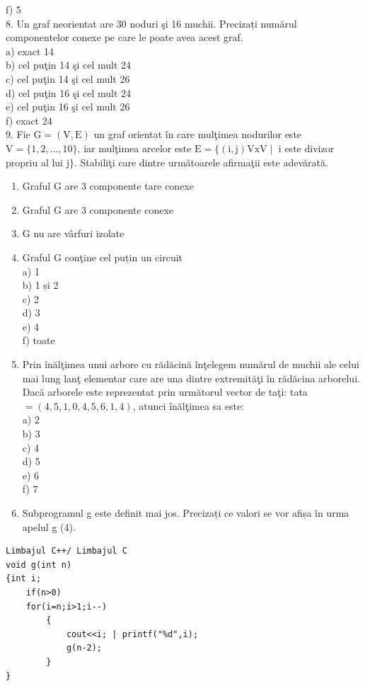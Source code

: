 \documentclass[10pt]{article}
\begin{document}
f) 5\\
8. Un graf neorientat are 30 noduri şi 16 muchii. Precizați numărul componentelor conexe pe care le poate avea acest graf.\\
a) exact 14\\
b) cel puţin 14 şi cel mult 24\\
c) cel puţin 14 şi cel mult 26\\
d) cel puţin 16 şi cel mult 24\\
e) cel puţin 16 şi cel mult 26\\
f) exact 24\\
9. Fie $\mathrm{G}=(\mathrm{V}, \mathrm{E})$ un graf orientat în care mulţimea nodurilor este $\mathrm{V}=\{1,2, \ldots, 10\}$, iar mulţimea arcelor este $\mathrm{E}=\{(\mathrm{i}, \mathrm{j}) \mathrm{VxV} \mid$ i este divizor propriu al lui j$\}$. Stabiliţi care dintre următoarele afirmaţii este adevărată.

\begin{enumerate}
  \item Graful G are 3 componente tare conexe
  \item Graful G are 3 componente conexe
  \item G nu are vârfuri izolate
  \item Graful G conţine cel puțin un circuit\\
a) 1\\
b) 1 și 2\\
c) 2\\
d) 3\\
e) 4\\
f) toate
  \item Prin înălţimea unui arbore cu rădăcină înţelegem numărul de muchii ale celui mai lung lanţ elementar care are una dintre extremităţi în rădăcina arborelui. Dacă arborele este reprezentat prin următorul vector de taţi: tata $=(4,5,1,0,4,5,6,1,4)$, atunci înălţimea sa este:\\
a) 2\\
b) 3\\
c) 4\\
d) 5\\
e) 6\\
f) 7
  \item Subprogramul g este definit mai jos. Precizați ce valori se vor afișa în urma apelul g (4).
\end{enumerate}

\begin{verbatim}
Limbajul C++/ Limbajul C
void g(int n)
{int i;
    if(n>0)
    for(i=n;i>1;i--)
        {
            cout<<i; | printf("%d",i);
            g(n-2);
        }
}
\end{verbatim}
\end{document}
